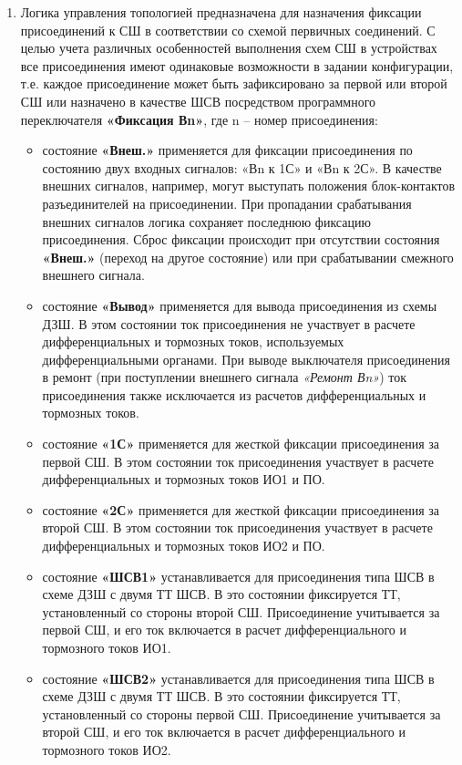 \begin{enumerate}[label=\arabic{section}.\arabic{subsection}.\arabic{enumi}, labelsep=4pt, leftmargin=0pt, itemindent=57pt, itemsep=0pt, parsep=5pt]
\begin{enumerate}[label=\arabic{section}.\arabic{subsection}.\arabic{enumi}.\arabic*, labelsep=4pt, leftmargin=0em, itemindent=65pt, parsep=0pt]
\item
Логика управления топологией предназначена для назначения фиксации присоединений к СШ в соответствии со схемой первичных соединений.
С целью учета различных особенностей выполнения схем СШ в устройствах все присоединения имеют одинаковые возможности в задании конфигурации, т.е. каждое присоединение может быть зафиксировано за первой или второй СШ или назначено в качестве ШСВ посредством программного переключателя \textbf{«Фиксация Вn»}, где n – номер присоединения:
\begin{itemize} 
\item состояние \textbf{«Внеш.»} применяется для фиксации присоединения по состоянию двух входных сигналов: «Вn к 1С» и «Вn к 2С». В качестве внешних сигналов, например, могут выступать положения блок-контактов разъединителей на присоединении.
При пропадании срабатывания внешних сигналов логика сохраняет последнюю фиксацию присоединения. Сброс фиксации происходит при отсутствии состояния \textbf{«Внеш.»} (переход на другое состояние) или при срабатывании смежного внешнего сигнала.
\item состояние \textbf{«Вывод»} применяется для вывода присоединения из схемы ДЗШ. В этом состоянии ток присоединения не участвует в расчете дифференциальных и тормозных токов, используемых дифференциальными органами.
При выводе выключателя присоединения в ремонт (при поступлении внешнего сигнала \textit{«Ремонт Вn»}) ток присоединения также исключается из расчетов дифференциальных и тормозных токов.
\item состояние \textbf{«1С»} применяется для жесткой фиксации присоединения за первой СШ. В этом состоянии ток присоединения участвует в расчете дифференциальных и тормозных токов ИО1 и ПО.
\item состояние \textbf{«2С»} применяется для жесткой фиксации присоединения за второй СШ. В этом состоянии ток присоединения участвует в расчете дифференциальных и тормозных токов ИО2 и ПО.
\item состояние \textbf{«ШСВ1»} устанавливается для присоединения типа ШСВ в схеме ДЗШ с двумя ТТ ШСВ. В это состоянии фиксируется ТТ, установленный со стороны второй СШ. Присоединение учитывается за первой СШ, и его ток включается в расчет дифференциального и тормозного токов ИО1.
\item состояние \textbf{«ШСВ2»} устанавливается для присоединения типа ШСВ в схеме ДЗШ с двумя ТТ ШСВ. В это состоянии фиксируется ТТ, установленный со стороны первой СШ. Присоединение учитывается за второй СШ, и его ток включается в расчет дифференциального и тормозного токов ИО2.

\end{itemize}
\end{enumerate}
\end{enumerate}
